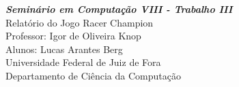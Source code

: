 \thispagestyle{empty}
\begin{center}
\large{
\textsl{\textbf{Seminário em Computação VIII - Trabalho III}}\\
\espaco
Relatório do Jogo Racer Champion \\
\espaco
Professor: Igor de Oliveira Knop \\
\espaco
Alunos: Lucas Arantes Berg\\
\espaco
Universidade Federal de Juiz de Fora\\
\espaco
Departamento de Ciência da Computação\\
\espaco
}
\end{center}